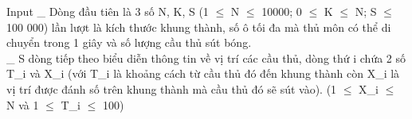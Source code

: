 Input
\_ Dòng đầu tiên là 3 số N, K, S (1 $\le$  N  $\le$ 10000; 0 $\le$  K  $\le$ N; S $\le$ 100 000) lần lượt là kích thước khung thành, số ô tối đa mà thủ môn có thể di chuyển trong 1 giây và số lượng cầu thủ sút bóng.   
\\   \_ S dòng tiếp theo biểu diễn thông tin về vị trí các cầu thủ, dòng thứ i chứa 2 số T\_i và X\_i (với T\_i là khoảng cách từ cầu thủ đó đến khung thành còn X\_i là vị trí được đánh số trên khung thành mà cầu thủ đó sẽ sút vào). (1 $\le$  X\_i  $\le$ N và 1 $\le$  T\_i  $\le$ 100)